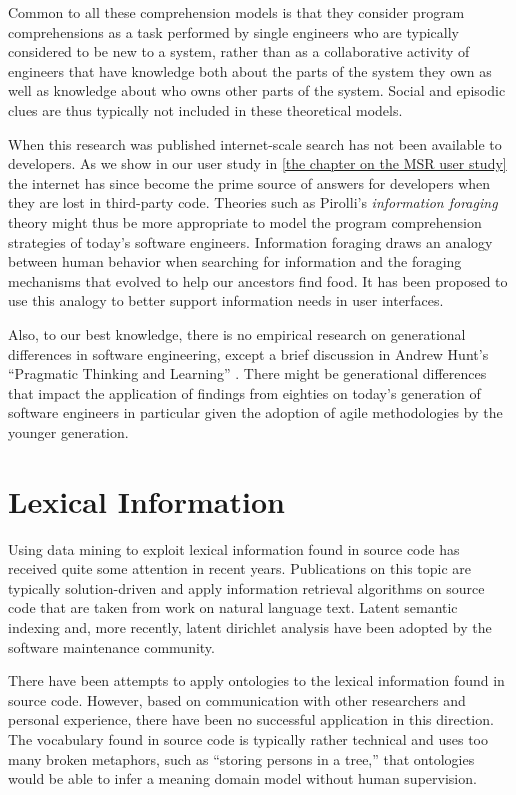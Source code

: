 Common to all these comprehension models is that they consider program comprehensions as a task performed by single engineers who are typically considered to be new to a system, rather than as a collaborative activity of engineers that have knowledge both about the parts of the system they own as well as knowledge about who owns other parts of the system. Social and episodic clues are thus typically not included in these theoretical models.

When this research was published internet-scale search has not been available to developers. As we show in our user study in \autoref{the chapter on the MSR user study} the internet has since become the prime source of answers for developers when they are lost in third-party code. Theories such as Pirolli's \emph{information foraging} theory \cite{Piro95a,Piro09a} might thus be more appropriate to model the program comprehension strategies of today's software engineers. Information foraging draws an analogy between human behavior when searching for information and the foraging mechanisms that evolved to help our ancestors find food. It has been proposed to use this analogy to better support  information needs in user interfaces.

Also, to our best knowledge, there is no empirical research on generational differences in software engineering, except a brief discussion in Andrew Hunt's ``Pragmatic Thinking and Learning'' \cite{Hunt08a}. There might be generational differences that impact the application of findings from eighties on today's generation of software engineers in particular given the adoption of agile methodologies by the younger generation.

\section{Lexical Information}

Using data mining to exploit lexical information found in source code has received quite some attention in recent years. Publications on this topic are typically solution-driven and apply information retrieval algorithms on source code that are taken from work on natural language text. Latent semantic indexing \cite{Deer90a} and, more recently, latent dirichlet analysis \cite{Bald08a} have been adopted by the software maintenance community. 

There have been attempts to apply ontologies to the lexical information found in source code. However, based on communication with other researchers and personal experience, there have been no successful application in this direction. The vocabulary found in source code is typically rather technical and uses too many broken metaphors, such as ``storing persons in a tree,'' that ontologies would be able to infer a meaning domain model without human supervision.

